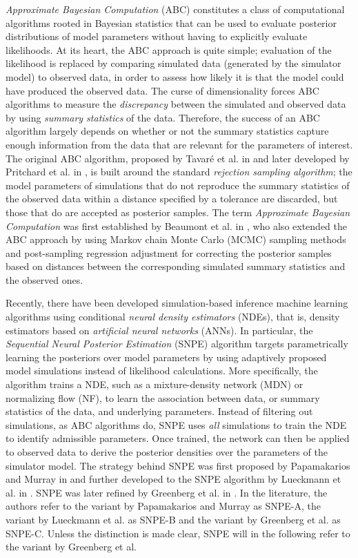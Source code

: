 \textit{Approximate Bayesian Computation} (ABC) constitutes a class of computational algorithms rooted in Bayesian statistics that can be used to evaluate posterior distributions of model parameters without having to explicitly evaluate likelihoods. At its heart, the ABC approach is quite simple; evaluation of the likelihood is replaced by comparing simulated data (generated by the simulator model) to observed data, in order to assess how likely it is that the model could have produced the observed data. The curse of dimensionality forces ABC algorithms to measure the \textit{discrepancy} between the simulated and observed data by using \textit{summary statistics} of the data. Therefore, the success of an ABC algorithm largely depends on whether or not the summary statistics capture enough information from the data that are relevant for the parameters of interest. The original ABC algorithm, proposed by Tavaré et al. in \cite{Tavare} and later developed by Pritchard et al. in \cite{Pritchard}, is built around the standard \textit{rejection sampling algorithm}; the model parameters of simulations that do not reproduce the summary statistics of the observed data within a distance specified by a tolerance are discarded, but those that do are accepted as posterior samples. The term \textit{Approximate Bayesian Computation} was first established by Beaumont et al. in \cite{Beaumont}, who also extended the ABC approach by using Markov chain Monte Carlo (MCMC) sampling methods and post-sampling regression adjustment for correcting the posterior samples based on distances between the corresponding simulated summary statistics and the observed ones.

Recently, there have been developed simulation-based inference machine learning algorithms using conditional \textit{neural density estimators} (NDEs), that is, density estimators based on \textit{artificial neural networks} (ANNs). In particular, the  \textit{Sequential Neural Posterior Estimation} (SNPE) algorithm targets parametrically learning the posteriors over model parameters by using adaptively proposed model simulations instead of likelihood calculations. More specifically, the algorithm trains a NDE, such as a mixture-density network (MDN) or normalizing flow (NF), to learn the association between data, or summary statistics of the data, and underlying parameters. Instead of filtering out simulations, as ABC algorithms do, SNPE uses \textit{all} simulations to train the NDE to identify admissible parameters. Once trained, the network can then be applied to observed data to derive the posterior densities over the parameters of the simulator model. The strategy behind SNPE was first proposed by Papamakarios and Murray in \cite{SNL_first} and further developed to the SNPE algorithm by Lueckmann et al. in \cite{SNPE_first}. SNPE was later refined by Greenberg et al. in \cite{SNPE_apt}. In the literature, the authors refer to the variant by Papamakarios and Murray as SNPE-A, the variant by Lueckmann et al. as SNPE-B and the variant by Greenberg et al. as SNPE-C. Unless the distinction is made clear, SNPE will in the following refer to the variant by Greenberg et al. 


